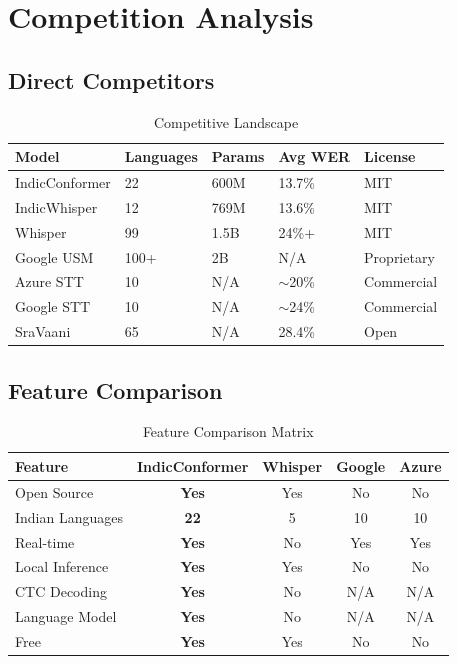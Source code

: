 \documentclass[12pt,a4paper]{article}
\begin{document}
\section{Competition Analysis}

\subsection{Direct Competitors}

\begin{table}[h]
\centering
\caption{Competitive Landscape}
\begin{tabular}{@{}p{2.5cm}p{2cm}p{2cm}p{2cm}p{2cm}@{}}
\toprule
\textbf{Model} & \textbf{Languages} & \textbf{Params} & \textbf{Avg WER} & \textbf{License} \\
\midrule
IndicConformer & 22 & 600M & 13.7\% & MIT \\
IndicWhisper & 12 & 769M & 13.6\% & MIT \\
Whisper & 99 & 1.5B & 24\%+ & MIT \\
Google USM & 100+ & 2B & N/A & Proprietary \\
Azure STT & 10 & N/A & $\sim$20\% & Commercial \\
Google STT & 10 & N/A & $\sim$24\% & Commercial \\
SraVaani & 65 & N/A & 28.4\% & Open \\
\bottomrule
\end{tabular}
\end{table}

\subsection{Feature Comparison}

\begin{table}[h]
\centering
\caption{Feature Comparison Matrix}
\begin{tabular}{@{}lcccc@{}}
\toprule
\textbf{Feature} & \textbf{IndicConformer} & \textbf{Whisper} & \textbf{Google} & \textbf{Azure} \\
\midrule
Open Source & \textbf{Yes} & Yes & No & No \\
Indian Languages & \textbf{22} & 5 & 10 & 10 \\
Real-time & \textbf{Yes} & No & Yes & Yes \\
Local Inference & \textbf{Yes} & Yes & No & No \\
CTC Decoding & \textbf{Yes} & No & N/A & N/A \\
Language Model & \textbf{Yes} & No & N/A & N/A \\
Free & \textbf{Yes} & Yes & No & No \\
\bottomrule
\end{tabular}
\end{table}
\end{document}
